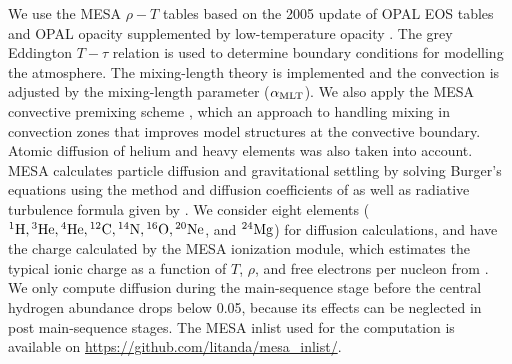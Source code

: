 We use the \textsc{MESA} $\rho-T$ tables based on the 2005
update of OPAL EOS tables \citep{2002ApJ...576.1064R} and OPAL opacity
supplemented by low-temperature opacity \citep{2005ApJ...623..585F}. 
The grey Eddington $T-\tau$ relation is used to determine boundary conditions for modelling the atmosphere.
The mixing-length theory is implemented and the convection is adjusted by the mixing-length parameter ($\alpha_{\rm MLT}$).
We also apply the \textsc{MESA} convective premixing scheme \citep{2019ApJS..243...10P}, which an approach to handling mixing in convection zones that improves model structures at the convective boundary.
Atomic diffusion of helium and heavy elements was also taken into account. MESA calculates particle diffusion and gravitational settling by solving Burger's equations using the method and diffusion coefficients of \citet{Thoul94} as well as  radiative turbulence formula given by \citet{2002A&A...390..611M}.
We consider eight elements (${}^1{\rm H}, {}^3{\rm He}, {}^4{\rm He}, {}^{12}{\rm C}, {}^{14}{\rm N}, {}^{16}{\rm O}, {}^{20}{\rm Ne}$, and ${}^{24}{\rm Mg}$) for diffusion calculations, and have the charge calculated by the MESA ionization module, which estimates the typical ionic charge as a function of $T$, $\rho$, and free electrons per nucleon from \citet{Paquette1986}. We only compute diffusion during the main-sequence stage before the central hydrogen abundance drops below 0.05, because its effects can be neglected in post main-sequence stages. 
The \textsc{MESA} inlist used for the computation is available on \url{https://github.com/litanda/mesa_inlist/}.  



